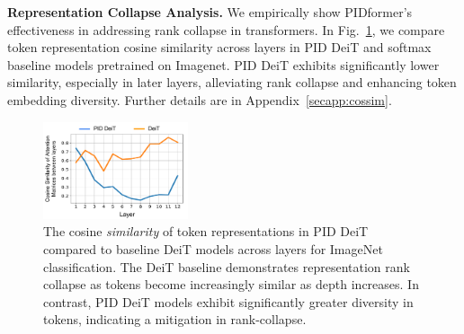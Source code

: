 \textbf{Representation Collapse Analysis.}
We empirically show PIDformer's effectiveness in addressing rank collapse in transformers. In Fig.~\ref{fig:pid-cossim}, we compare token representation cosine similarity across layers in PID DeiT and softmax baseline models pretrained on Imagenet. PID DeiT exhibits significantly lower similarity, especially in later layers, alleviating rank collapse and enhancing token embedding diversity. Further details are in Appendix~\ref{secapp:cossim}.
\begin{figure}[!t]
\vspace{-5mm}
\centering
\includegraphics[width=0.38\textwidth]{iclr_2023/pictures/pidrank-collapse.pdf}
\vspace{-3mm}
\caption{\small The cosine \textit{similarity} of token representations in PID DeiT compared to baseline DeiT models across layers for ImageNet classification. The DeiT baseline demonstrates representation rank collapse as tokens become increasingly similar as depth increases. In contrast, PID DeiT models exhibit significantly greater diversity in tokens, indicating a mitigation in rank-collapse.}
\label{fig:pid-cossim} 
\end{figure}